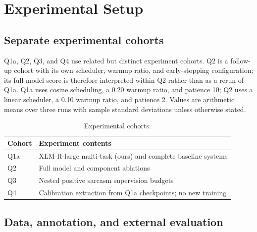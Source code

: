 \section{Experimental Setup}

\subsection{Separate experimental cohorts}
Q1a, Q2, Q3, and Q4 use related but distinct experiment cohorts. Q2 is a follow-up cohort with its own scheduler, warmup ratio, and early-stopping configuration; its full-model score is therefore interpreted within Q2 rather than as a rerun of Q1a. Q1a uses cosine scheduling, a 0.20 warmup ratio, and patience 10; Q2 uses a linear scheduler, a 0.10 warmup ratio, and patience 2. Values are arithmetic means over three runs with sample standard deviations unless otherwise stated.

\begin{table}[tb]
\centering
\small
\setlength{\tabcolsep}{3pt}
\begin{tabularx}{\columnwidth}{>{\raggedright\arraybackslash}X >{\raggedright\arraybackslash}X}
\hline
Cohort & Experiment contents \\
\hline
Q1a & XLM-R-large multi-task (ours) and complete baseline systems \\
Q2 & Full model and component ablations \\
Q3 & Nested positive sarcasm supervision budgets \\
Q4 & Calibration extraction from Q1a checkpoints; no new training \\
\hline
\end{tabularx}
\caption{Experimental cohorts.}
\label{tab:cohorts}
\end{table}

\subsection{Data, annotation, and external evaluation}

